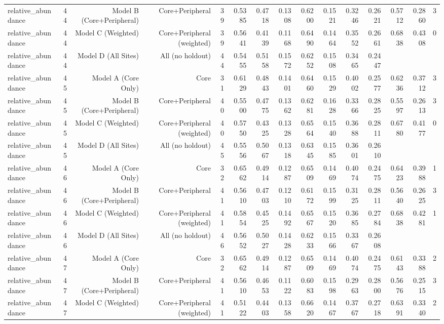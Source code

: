 {\begin{longtable}{lrrrrrrrrrrrrrr}
  relative\_abundance & 44 & Model B (Core+Peripheral) & Core+Peripheral & 39 & 0.5385 & 0.4718 & 0.1308 & 0.6200 & 0.1521 & 0.3246 & 0.2621 & 0.5712 & 0.2860 & 3 \\
  relative\_abundance & 44 & Model C (Weighted) & Core+Peripheral (weighted) & 39 & 0.5641 & 0.4139 & 0.1168 & 0.6490 & 0.1464 & 0.3552 & 0.2661 & 0.6838 & 0.4308 & 0 \\
  relative\_abundance & 44 & Model D (All Sites) & All (no holdout) & 44 & 0.5455 & 0.5158 & 0.1572 & 0.6252 & 0.1508 & 0.3465 & 0.2447 &  &  &  \\
  relative\_abundance & 45 & Model A (Core Only) & Core & 31 & 0.6129 & 0.4843 & 0.1401 & 0.6460 & 0.1529 & 0.4002 & 0.2577 & 0.6236 & 0.3712 & 3 \\
  relative\_abundance & 45 & Model B (Core+Peripheral) & Core+Peripheral & 40 & 0.5500 & 0.4775 & 0.1362 & 0.6281 & 0.1628 & 0.3366 & 0.2825 & 0.5597 & 0.2613 & 3 \\
  relative\_abundance & 45 & Model C (Weighted) & Core+Peripheral (weighted) & 40 & 0.5750 & 0.4325 & 0.1328 & 0.6564 & 0.1540 & 0.3688 & 0.2811 & 0.6780 & 0.4177 & 0 \\
  relative\_abundance & 45 & Model D (All Sites) & All (no holdout) & 45 & 0.5556 & 0.5067 & 0.1318 & 0.6345 & 0.1585 & 0.3601 & 0.2610 &  &  &  \\
  relative\_abundance & 46 & Model A (Core Only) & Core & 32 & 0.6562 & 0.4914 & 0.1287 & 0.6509 & 0.1469 & 0.4074 & 0.2475 & 0.6423 & 0.3988 & 1 \\
  relative\_abundance & 46 & Model B (Core+Peripheral) & Core+Peripheral & 41 & 0.5610 & 0.4703 & 0.1210 & 0.6172 & 0.1599 & 0.3125 & 0.2811 & 0.5640 & 0.2625 & 3 \\
  relative\_abundance & 46 & Model C (Weighted) & Core+Peripheral (weighted) & 41 & 0.5854 & 0.4525 & 0.1492 & 0.6567 & 0.1520 & 0.3685 & 0.2784 & 0.6838 & 0.4281 & 1 \\
  relative\_abundance & 46 & Model D (All Sites) & All (no holdout) & 46 & 0.5652 & 0.5027 & 0.1428 & 0.6233 & 0.1566 & 0.3367 & 0.2608 &  &  &  \\
  relative\_abundance & 47 & Model A (Core Only) & Core & 32 & 0.6562 & 0.4914 & 0.1287 & 0.6509 & 0.1469 & 0.4074 & 0.2475 & 0.6143 & 0.3388 & 2 \\
  relative\_abundance & 47 & Model B (Core+Peripheral) & Core+Peripheral & 41 & 0.5610 & 0.4653 & 0.1122 & 0.6083 & 0.1598 & 0.2963 & 0.2800 & 0.5676 & 0.2515 & 3 \\
  relative\_abundance & 47 & Model C (Weighted) & Core+Peripheral (weighted) & 41 & 0.5122 & 0.4403 & 0.1358 & 0.6620 & 0.1467 & 0.3767 & 0.2718 & 0.6391 & 0.3340 & 2 \\

\end{longtable}}
